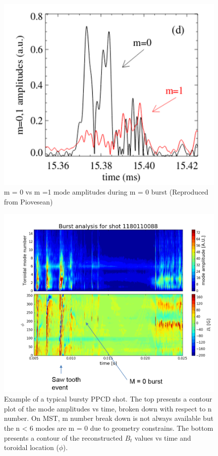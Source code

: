 \begin{figure}
	\centering
	\includegraphics[width = 1.\linewidth]{./m0_and_impurity_heating/m0_timing.png}
	\caption[m = 0 vs m =1 mode amplitudes during m = 0 burst]{m = 0 vs m =1 mode amplitudes during m = 0 burst (Reproduced from Piovesean\cite{Piovesan2008})}\label{fig:m0_time}
\end{figure}

\begin{figure}
	\centering
	\includegraphics[width = 1.\linewidth]{./m0_and_impurity_heating/m0_example.png}
	\caption[Example mode and $B_t$ behavior]{Example of a typical bursty PPCD shot. The top presents a contour plot of the mode amplitudes vs time, broken down with respect to n number. On MST, m number break down is not always available but the n < 6 modes are m = 0 due to geometry constrains. The bottom presents a contour of the reconstructed $B_t$ values vs time and toroidal location ($\phi$). }\label{fig:m0_time}
\end{figure}

